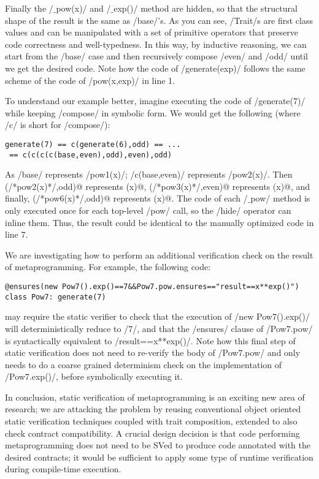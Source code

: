 Finally the /$\_$pow(x)/ and /$\_$exp()/ method are hidden, so that the structural shape of the result is
the same as /base/'s.
As you can see, /Trait/s are first class values and can be manipulated with a set of primitive operators that preserve code correctness and well-typedness.
In this way, by inductive reasoning, we can start from the /base/ case and then recursively compose /even/ and /odd/ until we get the desired code.
Note how the code of /generate(exp)/ follows the same scheme of the code of /pow(x,exp)/ in line 1.

To understand our example better, imagine executing the code of /generate(7)/ while keeping /compose/ in symbolic form. We would get the following (where /c/ is short for /compose/):
\vspace{-1ex}
\begin{lstlisting}[numbers=none]
generate(7) == c(generate(6),odd) == ...
 == c(c(c(c(base,even),odd),even),odd)
\end{lstlisting}
\vspace{-1ex}
As /base/ represents /pow1(x)/; /c(base,even)/ represents /pow2(x)/. Then \Q@c(/*pow2(x)*/,odd)@ represents (x)@, \Q@c(/*pow3(x)*/,even)@ represents (x)@, and finally,
\Q@c(/*pow6(x)*/,odd)@ represents (x)@.
The code of each /$\_$pow/ method is only executed once for each top-level /pow/ call, so the /hide/ operator can inline them.
Thus, the result could be identical to the manually optimized code in line 7.

We are investigating how
to perform an additional verification check
on the result of metaprogramming.
For example, the following code:
\vspace{-1ex}
\begin{lstlisting}[numbers=none]
@ensures(new Pow7().exp()==7&&Pow7.pow.ensures=="result==x**exp()")
class Pow7: generate(7)
\end{lstlisting}
\vspace{-1ex}
may require the static verifier to check that the execution of
/new Pow7().exp()/ will deterministically reduce to /7/, and that the /ensures/ clause of 
/Pow7.pow/ is syntactically equivalent to 
/result==x**exp()/. Note how this final step of static verification does not need to re-verify the body of
/Pow7.pow/ and only needs to do a coarse grained 
determinism check on the implementation of /Pow7.exp()/, before symbolically executing it.

In conclusion, static verification of metaprogramming is an exciting new area of research; we are attacking the problem by reusing conventional
object oriented static verification techniques coupled with trait composition, extended to also check contract compatibility. A crucial design decision is that code performing metaprogramming does not need to be SVed to produce code annotated with the desired contracts; it would be sufficient to apply some type of runtime verification during compile-time execution.